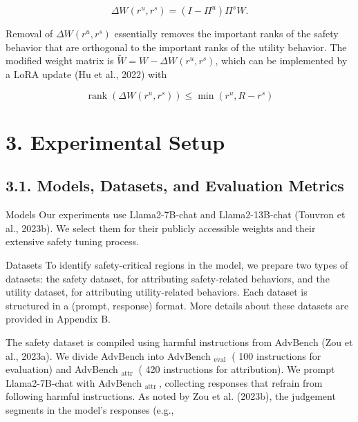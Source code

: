 \documentclass[10pt]{article}
\begin{document}
$$
\Delta W\left(r^{u}, r^{s}\right)=\left(I-\Pi^{u}\right) \Pi^{s} W .
$$

Removal of $\Delta W\left(r^{u}, r^{s}\right)$ essentially removes the important ranks of the safety behavior that are orthogonal to the important ranks of the utility behavior. The modified weight matrix is $\widetilde{W}=W-\Delta W\left(r^{u}, r^{s}\right)$, which can be implemented by a LoRA update (Hu et al., 2022) with

$$
\operatorname{rank}\left(\Delta W\left(r^{u}, r^{s}\right)\right) \leq \min \left(r^{u}, R-r^{s}\right)
$$

\section*{3. Experimental Setup}
\subsection*{3.1. Models, Datasets, and Evaluation Metrics}
Models Our experiments use Llama2-7B-chat and Llama2-13B-chat (Touvron et al., 2023b). We select them for their publicly accessible weights and their extensive safety tuning process.

Datasets To identify safety-critical regions in the model, we prepare two types of datasets: the safety dataset, for attributing safety-related behaviors, and the utility dataset, for attributing utility-related behaviors. Each dataset is structured in a (prompt, response) format. More details about these datasets are provided in Appendix B.

The safety dataset is compiled using harmful instructions from AdvBench (Zou et al., 2023a). We divide AdvBench into AdvBench ${ }_{\text {eval }}$ ( 100 instructions for evaluation) and AdvBench ${ }_{\text {attr }}$ ( 420 instructions for attribution). We prompt Llama2-7B-chat with AdvBench $_{\text {attr }}$, collecting responses that refrain from following harmful instructions. As noted by Zou et al. (2023b), the judgement segments in the model's responses (e.g.,
\end{document}

